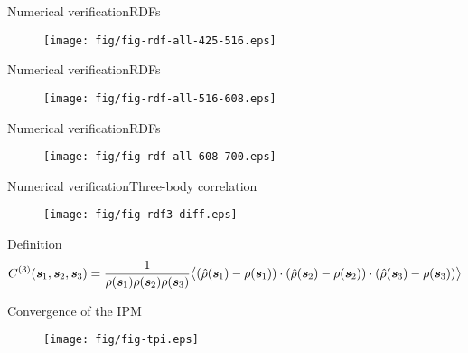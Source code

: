 \documentclass{beamer}
\newcommand{\bluec}[1]{{\color{blue} #1}}
\newcommand{\vect}[1]{\textbf{\textit{#1}}}
\newcommand{\corr}{C^{(3)}}
\begin{document}
\begin{frame}{Numerical verification}{RDFs}
  \begin{figure}
    \centering 
    \texttt{[image: fig/fig-rdf-all-425-516.eps]}
  \end{figure}  
\end{frame}

\begin{frame}{Numerical verification}{RDFs}
  \begin{figure}
    \centering 
    \texttt{[image: fig/fig-rdf-all-516-608.eps]}
  \end{figure}  
\end{frame}

\begin{frame}{Numerical verification}{RDFs}
  \begin{figure}
    \centering 
    \texttt{[image: fig/fig-rdf-all-608-700.eps]}
  \end{figure}  
\end{frame}


\begin{frame}{Numerical verification}{Three-body correlation}
  \begin{figure}
    \centering 
    \texttt{[image: fig/fig-rdf3-diff.eps]}
  \end{figure}  
  Definition
  \tiny{\bluec{
    \begin{align*}
      \corr (\vect s_1, \vect s_2, \vect s_3)
      =
      \frac1{\rho(\vect s_1)\rho(\vect s_2)\rho(\vect s_3)}
      \big\langle
      (\hat\rho(\vect s_1) - \rho(\vect s_1))\cdot
      (\hat\rho(\vect s_2) - \rho(\vect s_2))\cdot
      (\hat\rho(\vect s_3) - \rho(\vect s_3))
      \big\rangle
    \end{align*}}}
\end{frame}

\begin{frame}{Convergence of the IPM}
  \begin{figure}
    \centering 
    \texttt{[image: fig/fig-tpi.eps]}
  \end{figure}  
\end{frame}
\end{document}
